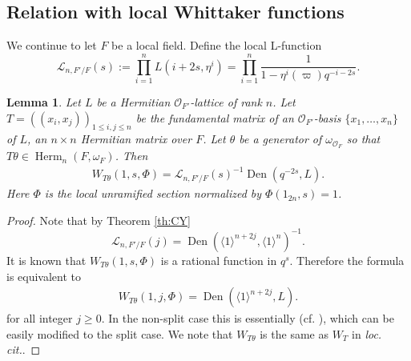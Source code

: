 \documentclass[reqno]{amsart}
\numberwithin{equation}{section}
\newcommand{\iden}{\langle1\rangle}
\newcommand{\sL}{\ensuremath{\mathscr{L}}\xspace}
\DeclareMathOperator{\Herm}{Herm}
\DeclareMathOperator{\Den}{Den}
\renewcommand{\th}{\theta}
\newcommand{\om}{\omega}
\newcommand\cO{\mathcal{O}}
\newtheorem{lemma}[thm]{Lemma}
\theoremstyle{remark}
\numberwithin{equation}{section}
\begin{document}
\subsection{Relation with local Whittaker functions}\label{sec:relation-with-local} We continue to let $F$ be a local field. 
Define the local L-function
\begin{equation*}
\sL_{n,F'/F}(s) :=\prod_{i=1}^nL(i+2s, \eta^i)=\prod_{i=1}^n\frac{1}{1-\eta^i (\varpi)q^{-i-2s}}.
\end{equation*}

\begin{lemma}\label{lem:Whi}
Let $L$ be a Hermitian $\cO_{F'}$-lattice of rank $n$. Let $T=((x_i, x_j))_{1\le i,j\le n}$ be the fundamental matrix of an $\cO_{F'}$-basis $\{x_1,\ldots, x_n\}$ of $L$, an $n\times n$ Hermitian matrix over $F$. Let $\th$ be a generator of $\om_{\cO_{F}}$ so that $T\th\in \Herm_{n}(F,\om_{F})$. Then
  \begin{align*}
W_{T\th}(1, s, \Phi)=\sL_{n,F'/F}(s)^{-1} \Den(q^{-2s},  L).
  \end{align*}
  Here $\Phi$ is the local unramified section normalized by $\Phi(1_{2n},s)=1$.
\end{lemma}
\begin{proof}
Note that by Theorem \ref{th:CY} 
$$\sL_{n,F'/F}( j)=\Den(\iden^{n+2j},  \iden^{n})^{-1}. $$
It is known that $W_{T\th}(1, s, \Phi)$ is a rational function in $q^{s}$.
Therefore the formula is equivalent to
  \begin{align*}
W_{T\th}(1, j, \Phi)= \Den(\iden^{n+2j},  L).
  \end{align*}
  for all integer $j\geq 0$. 
In the non-split case this is essentially \cite[Prop.~10.1]{KRII} (cf. \cite[\S3.3]{LZ1}), which can be easily modified to the split case. We note that $W_{T\th}$ is the same as $W_{T}$ in {\em loc. cit.}.
\end{proof}
%
%
%
%
\end{document}
